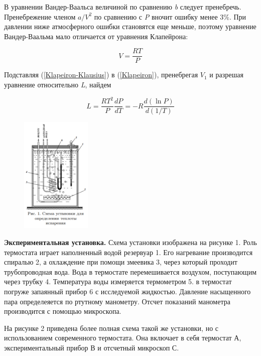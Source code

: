 \documentclass[12pt,a4paper]{article}
\begin{document}
В уравнении Вандер-Ваальса величиной по сравнению \textit{b} следует пренебречь. Пренебрежение членом $a/V^2$ по сравнению с \textit{P} вночит ошибку менее $3\%$. При давлении ниже атмосферного ошибки становятся еще меньше, поэтому уравнение Вандер-Ваальма мало отличается от уравнения Клапейрона:

\begin{equation}\label{Klapeiron}
V = \frac{RT}{P}
\end{equation}

Подставляя (\ref{Klapeiron-Klausius}) в (\ref{Klapeiron}), пренебрегая $V_1$ и разрешая уравнение относительно \textit{L}, найдем

\begin{equation}\label{3to1}
L = \frac{RT^2}{P} \frac{dP}{dT} = -R \frac{d(\ln P)}{d(1/T)}
\end{equation}

\begin{figure}
\includegraphics[width=0.3\textwidth]{Screenshot_1.png}
\label{ris:image}
\end{figure}

\textbf{Экспериментальная установка.} Схема установки изображена на рисунке 1. Роль термостата играет наполненный водой резервуар 1. Его нагревание производится спиралью 2, а охлаждение при помощи змеевика 3, через который проходит трубопроводная вода. Вода в термостате перемешивается воздухом, поступающим через трубку 4. Температура воды измеряется термометром 5. в термостат погруже запаянный прибор 6 с исследуемой жидкостью. Давление насыщенного пара определеяется по ртутному манометру. Отсчет показаний манометра производится с помощью микроскопа.

На рисунке 2 приведена более полная схема такой же установки, но с использованием современного термостата. Она включает в себя термостат А, экспериментальный прибор В и отсчетный микроскоп С.
\end{document}
